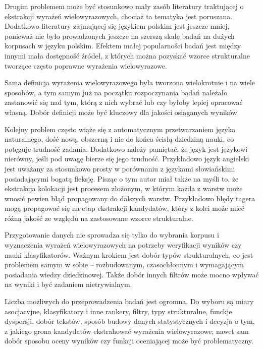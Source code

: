 \par
Drugim problemem może być stosunkowo mały zasób literatury traktującej o ekstrakcji wyrażeń wielowyrazowych, chociaż ta tematyka jest poruszana.
Dodatkowo literatury zajmującej się językiem polskim jest jeszcze mniej, ponieważ nie było prowadzonych jeszcze na szerszą skalę badań na dużych korpusach w języku polskim.
Efektem małej popularności badań jest między innymi mała dostępność źródeł, z których można pozyskać wzorce strukturalne tworzące często poprawne wyrażenia wielowyrazowe.

\par
Sama definicja wyrażenia wielowyrazowego była tworzona wielokrotnie i na wiele sposobów, a tym samym już na początku rozpoczynania badań należało zastanowić się nad tym, którą z nich wybrać lub czy byłoby lepiej opracować własną.
Dobór definicji może być kluczowy dla jakości osiąganych wyników.

\par
Kolejny problem często wiąże się z automatycznym przetwarzaniem języka naturalnego, dość nową, obszerną i nie do końca ścisłą dziedziną nauki, co potęguje trudność zadania.
Dodatkowo należy pamiętać, że język jest językowi nierówny, jeśli pod uwagę bierze się jego trudność.
Przykładowo język angielski jest uważany za stosunkowo prosty w porównaniu z językami słowiańskimi posiadającymi bogatą fleksję.
Pisząc o tym autor miał także na myśli to, że ekstrakcja kolokacji jest procesem złożonym, w którym każda z warstw może wnosić pewien błąd propagowany do dalszych warstw.
Przykładowo błędy tagera mogą propagować się na etap ekstrakcji kandydatów, który z kolei może mieć różną jakość ze względu na zastosowane wzorce strukturalne.

\par
Przygotowanie danych nie sprowadza się tylko do wybrania korpusu i wyznaczenia wyrażeń wielowyrazowych na potrzeby weryfikacji wyników czy nauki klasyfikatorów.
Ważnym krokiem jest dobór typów strukturalnych, co jest problemem samym w sobie -- rozbudowanym, czasochłonnym i wymagającym posiadania wiedzy dziedzinowej.
Także dobór innych filtrów może mocno wpływać na wyniki i być zadaniem nietrywialnym.

\par
Liczba możliwych do przeprowadzenia badań jest ogromna.
Do wyboru są miary asocjacyjne, klasyfikatory i inne rankery, filtry, typy strukturalne, funckje dyspersji, dobór tekstów, sposób budowy danych statystycznych i decyzja o tym, z jakiego grona kandydatów ekstrahować wyrażenia wielowyrazowe; nawet sam dobór sposobu oceny wyników czy funkcji oceniającej może być problematyczny.

